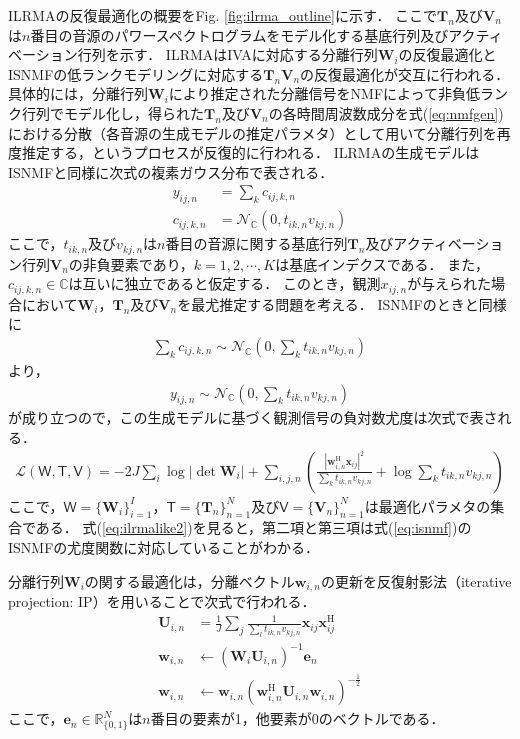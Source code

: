ILRMAの反復最適化の概要をFig. \ref{fig:ilrma_outline}に示す．
ここで$\bm{T}_n$及び$\bm{V}_n$は$n$番目の音源のパワースペクトログラムをモデル化する基底行列及びアクティベーション行列を示す．
ILRMAはIVAに対応する分離行列$\bm{W}_i$の反復最適化とISNMFの低ランクモデリングに対応する$\bm{T}_n\bm{V}_n$の反復最適化が交互に行われる．
具体的には，分離行列$\bm{W}_i$により推定された分離信号をNMFによって非負低ランク行列でモデル化し，得られた$\bm{T}_n$及び$\bm{V}_n$の各時間周波数成分を式(\ref{eq:nmfgen})における分散（各音源の生成モデルの推定パラメタ）として用いて分離行列を再度推定する，というプロセスが反復的に行われる．
ILRMAの生成モデルはISNMFと同様に次式の複素ガウス分布で表される．
\begin{align}
    y_{ij,n} &= \sum_k c_{ij,k,n} \\
    c_{ij,k,n} &= \mathcal{N}_{\mathbb{C}}(0, t_{ik,n} v_{kj,n}) \label{eq:ilrma_gen}
\end{align}
ここで，$t_{ik,n}$及び$v_{kj,n}$は$n$番目の音源に関する基底行列$\bm{T}_n$及びアクティベーション行列$\bm{V}_n$の非負要素であり，$k = 1, 2, \cdots, K$は基底インデクスである．
また，$c_{ij,k,n} \in \mathbb{C}$は互いに独立であると仮定する．
このとき，観測$x_{ij,n}$が与えられた場合において$\bm{W}_i$，$\bm{T}_n$及び$\bm{V}_n$を最尤推定する問題を考える．
ISNMFのときと同様に
\begin{align}
    \sum_k c_{ij,k,n} \sim \mathcal{N}_{\mathbb{C}}\left( 0, \sum_k t_{ik,n} v_{kj,n} \right)
\end{align}
より，
\begin{align}
    y_{ij,n} \sim \mathcal{N}_{\mathbb{C}}\left( 0, \sum_k t_{ik,n} v_{kj,n} \right) 
\end{align}
が成り立つので，この生成モデルに基づく観測信号の負対数尤度は次式で表される．
\begin{align}
    \mathcal{L}(\mathsf{W, T, V}) = -2J \sum_i \log | \det \bm{W}_i | + \sum_{i,j,n} \left( \frac{|\bm{w}_{i,n}^{\mathrm{H}}\bm{x}_{ij}|^2}{\sum_k t_{ik,n}v_{kj,n}} + \log \sum_k t_{ik,n}v_{kj,n} \right)
    \label{eq:ilrmalike2}
\end{align}
ここで，$\mathsf{W}=\{ \bm{W}_i \}_{i=1}^I$，$\mathsf{T}=\{ \bm{T}_n \}_{n=1}^N$及び$\mathsf{V}=\{ \bm{V}_n \}_{n=1}^N$は最適化パラメタの集合である．
式(\ref{eq:ilrmalike2})を見ると，第二項と第三項は式(\ref{eq:isnmf})のISNMFの尤度関数に対応していることがわかる．

分離行列$\bm{W}_i$の関する最適化は，分離ベクトル$\bm{w}_{i,n}$の更新を反復射影法（iterative projection: IP）\cite{auxIVA}を用いることで次式で行われる．
\begin{align}
\bm{U}_{i,n} &= \frac{1}{J} \sum_j \frac{1}{\sum_{l}t_{ik,n}v_{kj,n}} \bm{x}_{ij} \bm{x}_{ij}^{\mathrm{H}} \label{eq:ip1} \\
\bm{w}_{i,n} &\leftarrow (\bm{W}_i \bm{U}_{i,n})^{-1} \bm{e}_n \label{eq:ip2} \\
\bm{w}_{i,n} &\leftarrow \bm{w}_{i,n} ( \bm{w}_{i,n}^{\mathrm{H}} \bm{U}_{i,n} \bm{w}_{i,n} )^{-\frac{1}{2}} \label{eq:ip3}
\end{align}
ここで，$\bm{e}_n \in \mathbb{R}_{\{0, 1\}}^{N}$は$n$番目の要素が1，他要素が0のベクトルである．

